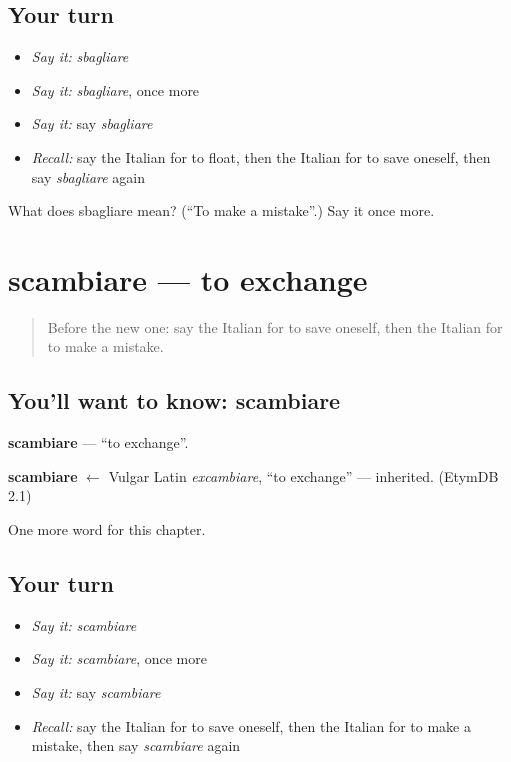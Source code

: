\subsection*{Your turn}
\begin{itemize}
\raggedright
  \item \emph{Say it:} \emph{sbagliare}
  \item \emph{Say it:} \emph{sbagliare}, once more
  \item \emph{Say it:} say \emph{sbagliare}
  \item \emph{Recall:} say the Italian for to float, then the Italian for to save oneself, then say \emph{sbagliare} again
\end{itemize}

\begin{tcolorbox}[breakable,colback=teal!4,colframe=teal!35!black,title={Before you move on}]
What does sbagliare mean? (\textquotedblleft{}To make a mistake\textquotedblright{}.) Say it once more.
\end{tcolorbox}
\section[scambiare]{scambiare — to exchange}

\label{lesson:IT-C150-scambiare}



\begin{quote}
Before the new one: say the Italian for to save oneself, then the Italian for to make a mistake.
\end{quote}

\subsection*{You'll want to know: scambiare}
\textbf{scambiare} — \textquotedblleft{}to exchange\textquotedblright{}.

\begin{cousinweb}
\textbf{scambiare} $\leftarrow$ Vulgar Latin \emph{excambiare}, \textquotedblleft{}to exchange\textquotedblright{} — inherited. (EtymDB 2.1)
\end{cousinweb}

\begin{grammarlens}[title={What you've built}]
One more word for this chapter.
\end{grammarlens}

\subsection*{Your turn}
\begin{itemize}
\raggedright
  \item \emph{Say it:} \emph{scambiare}
  \item \emph{Say it:} \emph{scambiare}, once more
  \item \emph{Say it:} say \emph{scambiare}
  \item \emph{Recall:} say the Italian for to save oneself, then the Italian for to make a mistake, then say \emph{scambiare} again
\end{itemize}

